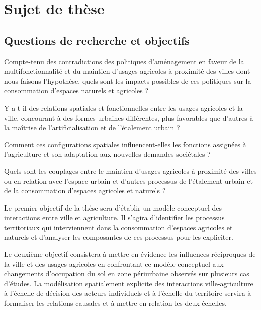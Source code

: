 \section{Sujet de thèse}

\subsection{Questions de recherche et objectifs}

Compte-tenu des contradictions des politiques d'aménagement
en faveur de la multifonctionnalité et du maintien
d'usages agricoles à proximité des villes dont nous faisons l'hypothèse,
quels sont les impacts possibles de ces politiques
sur la consommation d'espaces naturels et agricoles ?

\startitemize[n]

\item	Y a-t-il des relations spatiales et fonctionnelles entre les usages agricoles
	et la ville, concourant à des formes urbaines différentes,
	plus favorables que d'autres à la maîtrise de l'artificialisation
	et de l'étalement urbain ?

\item	Comment ces configurations spatiales influencent-elles les fonctions
	assignées à l'agriculture et son adaptation aux nouvelles demandes sociétales ?

\item	Quels sont les couplages entre le maintien d'usages agricoles
	à proximité des villes ou en relation avec l'espace urbain
	et d'autres processus de l'étalement urbain et de la consommation
	d'espaces agricoles et naturels ?

\stopitemize

Le premier objectif de la thèse sera d'établir
un modèle conceptuel des interactions entre ville et agriculture.
Il s'agira d'identifier les processus territoriaux
qui interviennent dans la consommation d'espaces agricoles et naturels
et d'analyser les composantes de ces processus pour les expliciter.

Le deuxième objectif consistera à mettre en évidence
les influences réciproques de la ville et des usages agricoles
en confrontant ce modèle conceptuel aux changements d'occupation
du sol en zone périurbaine observés sur plusieurs cas d'études.
La modélisation spatialement explicite des interactions ville-agriculture
à l'échelle de décision des acteurs individuels
et à l'échelle du territoire servira à formaliser les relations causales
et à mettre en relation les deux échelles.

